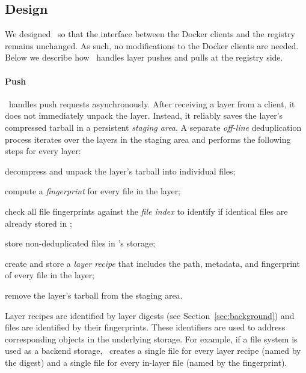 \subsection{Design}
\label{sec:design}

%
We designed \sysname\ so that the interface between the Docker clients and the
registry remains unchanged.
%
As such, no modifications to the Docker clients are needed.
%
Below we describe how \sysname\ handles layer pushes and
pulls at the registry side.
%

\paragraph{Push}
%
\sysname\ handles push requests asynchronously.
%
After receiving a layer from a client, it does not immediately unpack the layer.
%
Instead, it reliably saves the layer's compressed tarball in a persistent
\emph{staging area}.
%
A separate \emph{off-line} deduplication process iterates over the layers in
the staging area and performs the following steps for every layer:
%
\begin{compactenumerate}
  \item decompress and unpack the layer's tarball into individual files;
  \item compute a \emph{fingerprint} for every file in the layer;
  \item check all file fingerprints against the \emph{file index} to
	identify if identical files are already stored in \sysname;
  \item store non-deduplicated files in \sysname's storage;
  \item create and store a \emph{layer recipe} that includes the path,
	metadata, and fingerprint of every file in the layer;
  \item remove the layer's tarball from the staging area.
\end{compactenumerate}

%
%
Layer recipes are identified by layer digests (see Section~\ref{sec:background})
and files are identified by their fingerprints.
%
These identifiers are used to address corresponding objects in the
underlying storage.
%
For example, if a file system is used as a backend storage, \sysname\ creates a
single file for every layer recipe (named by the digest) and a single file for
every in-layer file (named by the fingerprint).


